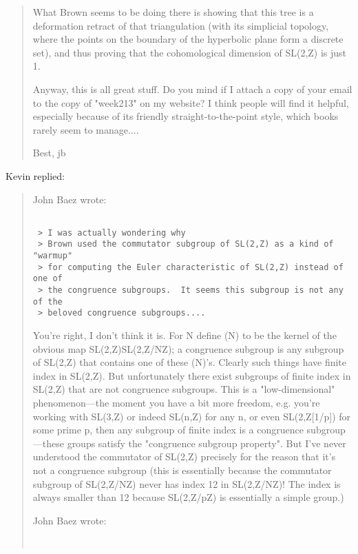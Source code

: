 \begin{quote}
 What Brown seems to be doing there is showing that this tree
 is a deformation retract of that triangulation (with its simplicial
 topology, where the points on the boundary of the hyperbolic plane
 form a discrete set), and thus proving that the cohomological dimension
 of SL(2,Z) is just 1.

 Anyway, this is all great stuff.  Do you mind if I attach a copy of
 your email to the copy of "week213" on my website?  I think people
 will find it helpful, especially because of its friendly
 straight-to-the-point style, which books rarely seem to manage....
   
 Best,
 jb
\end{quote}

Kevin replied:

\begin{quote}

 John Baez wrote:

\begin{verbatim}

 > I was actually wondering why
 > Brown used the commutator subgroup of SL(2,Z) as a kind of "warmup"
 > for computing the Euler characteristic of SL(2,Z) instead of one of
 > the congruence subgroups.  It seems this subgroup is not any of the
 > beloved congruence subgroups....
\end{verbatim}
    
 You're right, I don't think it is. For N define \Gamma (N) to
 be the kernel of the obvious map SL(2,Z)\to SL(2,Z/NZ); a congruence
 subgroup is any subgroup of SL(2,Z) that contains one of these
 \Gamma (N)'s. Clearly such things have finite index in SL(2,Z). But
 unfortunately there exist subgroups of finite index in SL(2,Z) that
 are not congruence subgroups. This is a "low-dimensional"
 phenomenon---the moment you have a bit more freedom, e.g. you're
 working with SL(3,Z) or indeed SL(n,Z) for any n, or even
 SL(2,Z[1/p]) for some prime p, then any subgroup of finite index
 is a congruence subgroup---these groups satisfy the "congruence
 subgroup property". But I've never understood the commutator
 of SL(2,Z) precisely for the reason that it's not a congruence
 subgroup (this is essentially because the commutator subgroup
 of SL(2,Z/NZ) never has index 12 in SL(2,Z/NZ)! The index is always
 smaller than 12 because SL(2,Z/pZ) is essentially a simple group.)

John Baez wrote:

\begin{verbatim}


\end{verbatim}
\end{quote}
